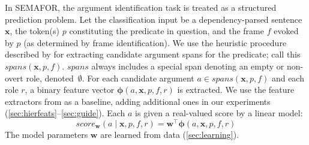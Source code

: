 \documentclass[11pt,a4paper]{article}
\begin{document}
In SEMAFOR, the argument identification task is treated as a structured
prediction problem.
Let the classification input be a dependency-parsed sentence $\mathbf{x}$, 
the token(s) $p$ constituting the predicate in question, and the frame $f$ evoked by $p$
(as determined by frame identification). 
We use the heuristic procedure described by \citep{das-14} for extracting candidate argument spans 
for the predicate; call this $\textit{spans}(\mathbf{x}, p, f)$.
$\textit{spans}$ always includes a special span denoting an empty or non-overt
role, denoted~$\emptyset$.
For each candidate argument $a \in \textit{spans}(\mathbf{x}, p, f)$
and each role
$r$, a binary feature vector $\boldsymbol{\phi}(a, \mathbf{x}, p, f, r)$ is extracted.
We use the feature extractors from \citep{das-14} as a baseline, adding
additional ones in our experiments 
(\cref{sec:hierfeats}--\cref{sec:guide}). %
Each $a$ is given a real-valued score by a linear model:
\begin{equation}\label{eq:score}
\textit{score}_\mathbf{w}(a \mid \mathbf{x}, p, f, r) = \mathbf{w}^\top \boldsymbol{\phi}(a, \mathbf{x}, p, f, r)
\end{equation}
The model parameters $\mathbf{w}$ are learned from 
data (\cref{sec:learning}).

\end{document}
